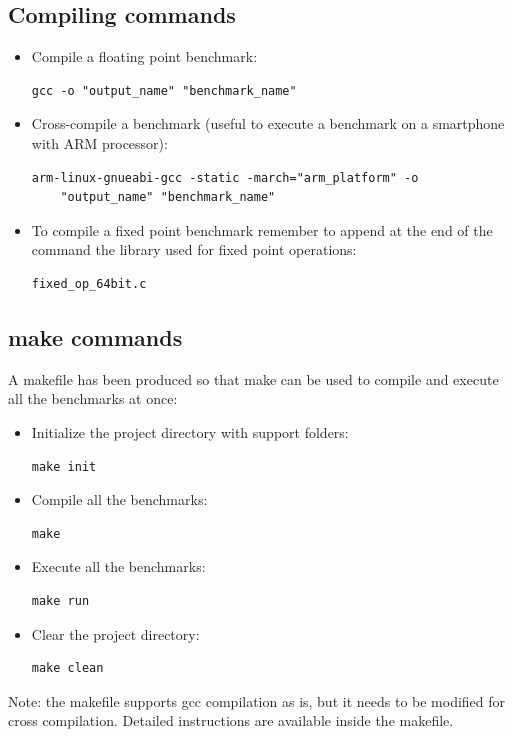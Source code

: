 \subsection{Compiling commands}
\begin{itemize}
	\item Compile a floating point benchmark: \begin{verbatim}gcc -o "output_name" "benchmark_name"\end{verbatim}
	\item Cross-compile a benchmark (useful to execute a benchmark on a smartphone with ARM processor): \begin{verbatim}arm-linux-gnueabi-gcc -static -march="arm_platform" -o 
	"output_name" "benchmark_name"\end{verbatim}
	\item To compile a fixed point benchmark remember to append at the end of the command the library used for fixed point operations: \begin{verbatim}fixed_op_64bit.c\end{verbatim}
\end{itemize}


\subsection{make commands}

A makefile has been produced so that make can be used to compile and execute all the benchmarks at once:

\begin{itemize}
	\item Initialize the project directory with support folders:\begin{verbatim}make init\end{verbatim}
	\item Compile all the benchmarks: \begin{verbatim}make\end{verbatim}
	\item Execute all the benchmarks: \begin{verbatim}make run\end{verbatim}
	\item Clear the project directory: \begin{verbatim}make clean\end{verbatim}
\end{itemize}
Note: the makefile supports gcc compilation as is, but it needs to be modified for cross compilation. Detailed instructions are available inside the makefile.

